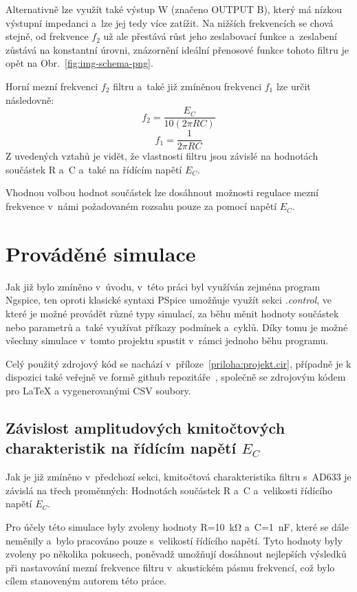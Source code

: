 \documentclass{protokol}
\begin{document}
	Alternativně lze využít také výstup W (značeno OUTPUT B), který má nízkou výstupní impedanci a~lze jej tedy více zatížit. Na nižších frekvencích se chová stejně, od frekvence \(f_{2} \) už ale přestává růst jeho zeslabovací funkce a~zeslabení zůstává na konstantní úrovni, znázornění ideální přenosové funkce tohoto filtru je opět na Obr.~\ref{fig:img-schema-png}.

	Horní mezní frekvenci \(f_{2} \) filtru a~také již zmíněnou frekvenci \(f_{1} \) lze určit následovně:
	\[
		f_{2} =\frac{E_{C} }{10(2\pi RC)}
	\]
	\[
		f_{1} =\frac{1}{2\pi RC}
	\]
	Z uvedených vztahů je vidět, že vlastnosti filtru jsou závislé na hodnotách součástek R a~C a~také na řídícím napětí \(E_{C} \).
	
	Vhodnou volbou hodnot součástek lze dosáhnout možnosti regulace mezní frekvence v~námi požadovaném rozsahu pouze za pomocí napětí \(E_{C} \). 

\clearpage
\section{Prováděné simulace}
	Jak již bylo zmíněno v~úvodu, v~této  práci byl využíván zejména program Ngspice, ten oproti klasické syntaxi PSpice umožňuje využít sekci \textit{.control}, ve které je možné provádět různé typy simulací, za běhu měnit hodnoty součástek nebo parametrů a~také využívat příkazy podmínek a~cyklů. Díky tomu je možné všechny simulace v~tomto projektu spustit v~rámci jednoho běhu programu. 
	
	Celý použitý zdrojový kód se nachází v~příloze~\ref{priloha:projekt.cir}, případně je k dispozici také veřejně ve formě github repozitáře~\cite{github-repo}, společně se zdrojovým kódem pro LaTeX a vygenerovanými CSV soubory.

	\subsection{Závislost amplitudových kmitočtových charakteristik na řídícím napětí \(E_{C}\)}
		Jak je již zmíněno v~předchozí sekci, kmitočtová charakteristika filtru s~AD633 je závislá na třech proměnných: Hodnotách součástek R a~C a~velikosti řídícího napětí \(E_{C} \). 
		
		Pro účely této simulace byly zvoleny hodnoty R=\qty{10}{\kilo\ohm} a~C=\qty{1}{\nano\farad}, které se dále neměnily a~bylo pracováno pouze s~velikostí řídícího napětí. Tyto hodnoty byly zvoleny po několika pokusech, poněvadž umožňují dosáhnout nejlepších výsledků při nastavování mezní frekvence filtru v~akustickém pásmu frekvencí, což bylo cílem stanoveným autorem této práce.
		
\end{document}
